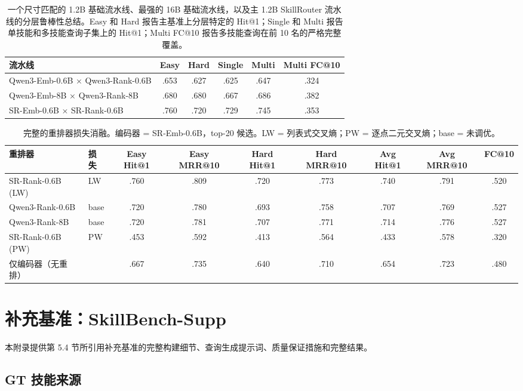 \documentclass[11pt,UTF8,fontset=fandol]{ctexart}
\makeatletter
\newcommand{\Hit}{Hit@1}
\makeatother
\begin{document}
\begin{table}[H]\centering
\caption{一个尺寸匹配的 1.2B 基础流水线、最强的 16B 基础流水线，以及主 1.2B SkillRouter 流水线的分层鲁棒性总结。Easy 和 Hard 报告主基准上分层特定的 \Hit{}；Single 和 Multi 报告单技能和多技能查询子集上的 \Hit{}；Multi FC@10 报告多技能查询在前 10 名的严格完整覆盖。}
\begin{tabular}{lccccc}
\toprule
流水线 & Easy & Hard & Single & Multi & Multi FC@10 \\ \midrule
Qwen3-Emb-0.6B $\times$ Qwen3-Rank-0.6B & .653 & .627 & .625 & .647 & .324 \\
Qwen3-Emb-8B $\times$ Qwen3-Rank-8B & .680 & .680 & .667 & .686 & .382 \\
SR-Emb-0.6B $\times$ SR-Rank-0.6B & .760 & .720 & .729 & .745 & .353 \\
\bottomrule
\end{tabular}
\label{tab:22}
\end{table}

\begin{table}[H]\centering
\caption{完整的重排器损失消融。编码器 = SR-Emb-0.6B，top-20 候选。LW = 列表式交叉熵；PW = 逐点二元交叉熵；base = 未调优。}
\small
\begin{tabular}{llccccccc}
\toprule
重排器 & 损失 & Easy \Hit{} & Easy MRR@10 & Hard \Hit{} & Hard MRR@10 & Avg \Hit{} & Avg MRR@10 & FC@10 \\ \midrule
SR-Rank-0.6B (LW) & LW & .760 & .809 & .720 & .773 & .740 & .791 & .520 \\
Qwen3-Rank-0.6B & base & .720 & .780 & .693 & .758 & .707 & .769 & .527 \\
Qwen3-Rank-8B & base & .720 & .781 & .707 & .771 & .714 & .776 & .527 \\
SR-Rank-0.6B (PW) & PW & .453 & .592 & .413 & .564 & .433 & .578 & .320 \\
仅编码器（无重排） & & .667 & .735 & .640 & .710 & .654 & .723 & .480 \\
\bottomrule
\end{tabular}
\label{tab:23}
\end{table}

\section{补充基准：SkillBench-Supp}

本附录提供第 5.4 节所引用补充基准的完整构建细节、查询生成提示词、质量保证措施和完整结果。

\subsection{GT 技能来源}
\end{document}
